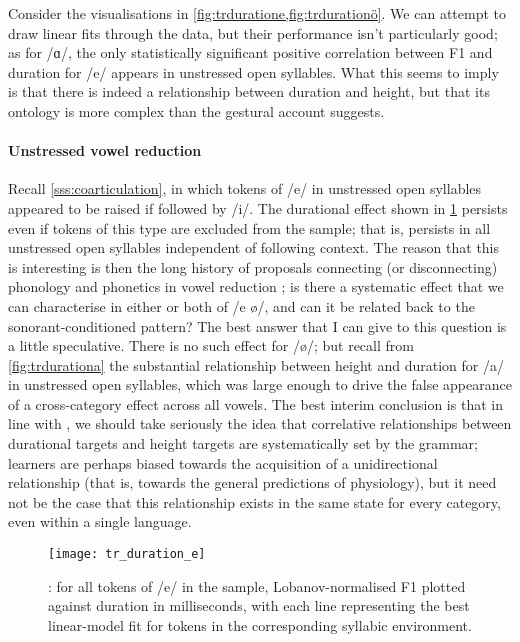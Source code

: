 Consider the visualisations in \cref{fig:trduratione,fig:trdurationö}. We can attempt to draw linear fits through the data, but their performance isn't particularly good; as for /ɑ/, the only statistically significant positive correlation between F1 and duration for /e/ appears in unstressed open syllables. What this seems to imply is that there is indeed a relationship between duration and height, but that its ontology is more complex than the gestural account suggests.

\paragraph{Unstressed vowel reduction} Recall \cref{sss:coarticulation}, in which tokens of /e/ in unstressed open syllables appeared to be raised if followed by /i/. The durational effect shown in \cref{fig:trduratione} persists even if tokens of this type are excluded from the sample; that is, persists in all unstressed open syllables independent of following context. The reason that this is interesting is then the long history of proposals connecting (or disconnecting) phonology and phonetics in vowel reduction \citep{Barnes2007,Iosad2012}; is there a systematic effect that we can characterise in either or both of /e ø/, and can it be related back to the sonorant-conditioned pattern? The best answer that I can give to this question is a little speculative. There is no such effect for /ø/; but recall from \cref{fig:trdurationa} the substantial relationship between height and duration for /a/ in unstressed open syllables, which was large enough to drive the false appearance of a cross-category effect across all vowels. The best interim conclusion is that in line with \citet{Tauberer2009,Sole2010,Toivonen2015}, we should take seriously the idea that correlative relationships between durational targets and height targets are systematically set by the grammar; learners are perhaps biased towards the acquisition of a unidirectional relationship (that is, towards the general predictions of physiology), but it need not be the case that this relationship exists in the same state for every category, even within a single language.

\begin{figure}[H]
  \centering
  \texttt{[image: tr\_duration\_e]}
  \caption[ correlation for /e/, split by environment.]{: for all tokens of /e/ in the sample, Lobanov-normalised F1 plotted against duration in milliseconds, with each line representing the best linear-model fit for tokens in the corresponding syllabic environment.}
  \label{fig:trduratione}
\end{figure}


